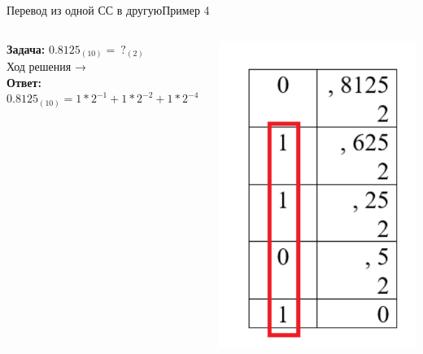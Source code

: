 \documentclass[t, 10pt, handout, aspectratio=169]{beamer}
\begin{document}
\begin{frame}{Перевод из одной СС в другую}{Пример 4}
  \begin{columns}[2]
    \begin{column}{.7\textwidth}
        \textbf{Задача:} $ 0.8125_{(10)} = \ ?_{(2)} $
        \\[1.2cm]
        Ход решения →
        \\[1.2cm]
        \textbf{Ответ:} $0.8125_{(10)} = 1*2^{-1} +1*2^{-2} +1*2^{-4} = 0.1101_{(2)}$
    \end{column}
    \begin{column}{0.3\textwidth}
        \vspace{-1.9cm}
        \includegraphics[width=\textwidth, scale=0.4]{logos/table_frac_inf.png}
    \end{column}
  \end{columns}
\end{frame}
\end{document}
